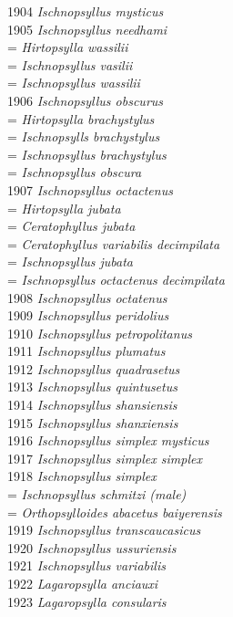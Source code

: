 \documentclass[
]{article}
\begin{document}
1904 \emph{Ischnopsyllus mysticus}\\
1905 \emph{Ischnopsyllus needhami}\\
= \emph{Hirtopsylla wassilii}\\
= \emph{Ischnopsyllus vasilii}\\
= \emph{Ischnopsyllus wassilii}\\
1906 \emph{Ischnopsyllus obscurus}\\
= \emph{Hirtopsylla brachystylus}\\
= \emph{Ischnopsylls brachystylus}\\
= \emph{Ischnopsyllus brachystylus}\\
= \emph{Ischnopsyllus obscura}\\
1907 \emph{Ischnopsyllus octactenus}\\
= \emph{Hirtopsylla jubata}\\
= \emph{Ceratophyllus jubata}\\
= \emph{Ceratophyllus variabilis decimpilata}\\
= \emph{Ischnopsyllus jubata}\\
= \emph{Ischnopsyllus octactenus decimpilata}\\
1908 \emph{Ischnopsyllus octatenus}\\
1909 \emph{Ischnopsyllus peridolius}\\
1910 \emph{Ischnopsyllus petropolitanus}\\
1911 \emph{Ischnopsyllus plumatus}\\
1912 \emph{Ischnopsyllus quadrasetus}\\
1913 \emph{Ischnopsyllus quintusetus}\\
1914 \emph{Ischnopsyllus shansiensis}\\
1915 \emph{Ischnopsyllus shanxiensis}\\
1916 \emph{Ischnopsyllus simplex mysticus}\\
1917 \emph{Ischnopsyllus simplex simplex}\\
1918 \emph{Ischnopsyllus simplex}\\
= \emph{Ischnopsyllus schmitzi (male)}\\
= \emph{Orthopsylloides abacetus baiyerensis}\\
1919 \emph{Ischnopsyllus transcaucasicus}\\
1920 \emph{Ischnopsyllus ussuriensis}\\
1921 \emph{Ischnopsyllus variabilis}\\
1922 \emph{Lagaropsylla anciauxi}\\
1923 \emph{Lagaropsylla consularis}\\
\end{document}

